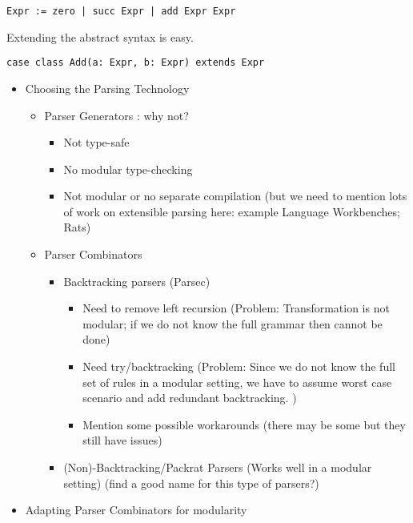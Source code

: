 \begin{lstlisting}[language=PlainCode]
Expr := zero | succ Expr | add Expr Expr
\end{lstlisting}

Extending the abstract syntax is easy.

\begin{lstlisting}
case class Add(a: Expr, b: Expr) extends Expr
\end{lstlisting}



\begin{itemize}
\item Choosing the Parsing Technology
    \begin{itemize}
    \item Parser Generators : why not?
        \begin{itemize}
            \item Not type-safe
            \item No modular type-checking
            \item Not modular or no separate compilation (but we need to mention lots of work on extensible parsing here: example Language Workbenches; Rats)
        \end{itemize}
    \item Parser Combinators
        \begin{itemize}
        \item Backtracking parsers (Parsec)
            \begin{itemize}
            \item Need to remove left recursion (Problem: Transformation is not modular; if we do not know the full grammar then cannot be done)
            \item Need try/backtracking (Problem: Since we do not know the full set of rules in a modular setting, we have to assume worst case scenario and add redundant backtracking. )
            \item Mention some possible workarounds (there may be some but they still have issues)
            \end{itemize}
        \item (Non)-Backtracking/Packrat Parsers (Works well in a modular setting) (find a good name for this type of parsers?)
        \end{itemize}
    \end{itemize}
\item Adapting Parser Combinators for modularity
    \begin{itemize}

\end{itemize}
\end{itemize}
